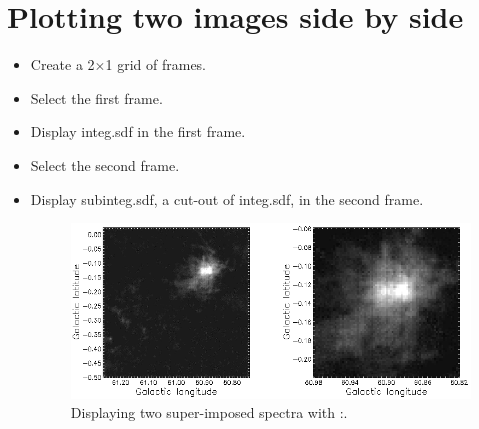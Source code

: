 \documentclass[11pt,oneside,chapters]{starlink}
\begin{document}
\section{Plotting two images side by side}

\begin{itemize}
\item Create a 2$\times$1 grid of frames.
\begin{terminalv}
\end{terminalv}
\item Select the first frame.
\begin{terminalv}
\end{terminalv}
\item Display integ.sdf in the first frame.
\begin{terminalv}
\end{terminalv}


\item Select the second frame.
\begin{terminalv}
\end{terminalv}
\item Display subinteg.sdf, a cut-out of integ.sdf, in the second frame.
\begin{terminalv}
\end{terminalv}

\begin{figure}[h!]
\begin{center}
\includegraphics[width=0.8\linewidth]{sc20_display7}
\caption[Displaying two super-imposed spectra with \Kappa:\linplot.]{\label{fig:display7}
  Displaying two super-imposed spectra with \Kappa:\linplot.}
\end{center}
\end{figure}


\end{itemize}
\end{document}
